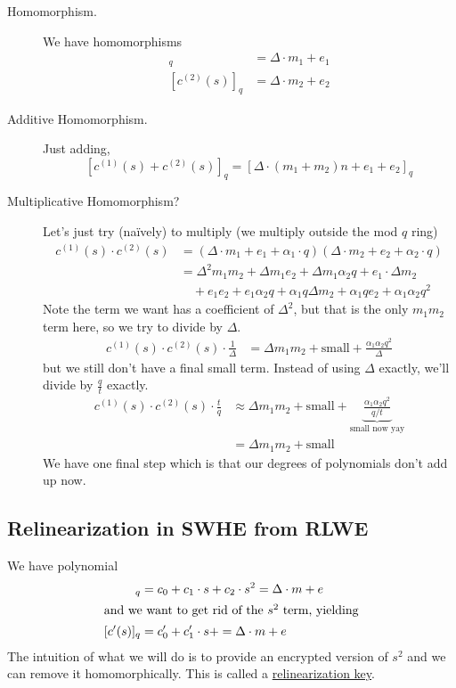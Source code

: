 \begin{description}
    \item[Homomorphism.] We have homomorphisms
        \begin{align*}
            [c^{(1)}(s)]_q & = \Delta\cdot m_1 + e_1 \\
            [c^{(2)}(s)]_q & = \Delta\cdot m_2 + e_2
        \end{align*}
    \item[Additive Homomorphism.] Just adding,
        \[[c^{(1)}(s) + c^{(2)}(s)]_q = [\Delta\cdot (m_1 + m_2)n + e_1 + e_2]_q\]
    \item[Multiplicative Homomorphism?] Let's just try (na\"ively) to multiply (we multiply outside the mod $q$ ring)
        \begin{align*}
            c^{(1)}(s) \cdot c^{(2)}(s)
             & = (\Delta\cdot m_1 + e_1 + \alpha_1\cdot q)(\Delta\cdot m_2 + e_2 + \alpha_2\cdot q)     \\
             & = \Delta^2 m_1m_2 + \Delta m_1e_2 + \Delta m_1\alpha_2q + e_1\cdot \Delta m_2            \\
             & \quad + e_1e_2 + e_1\alpha_2q + \alpha_1q\Delta m_2 + \alpha_1qe_2 + \alpha_1\alpha_2q^2
        \end{align*}
        Note the term we want has a coefficient of $\Delta^2$, but that is the only $m_1m_2$ term here, so we try to divide by $\Delta$.
        \begin{align*}
            c^{(1)}(s) \cdot c^{(2)}(s)\cdot \frac{1}{\Delta}
             & = \Delta m_1m_2 + \text{small} + \frac{\alpha_1\alpha_2q^2}{\Delta}
        \end{align*}
        but we still don't have a final small term. Instead of using $\Delta$ exactly, we'll divide by $\frac{q}{t}$ exactly.
        \begin{align*}
            c^{(1)}(s) \cdot c^{(2)}(s)\cdot \frac{t}{q}
             & \approx \Delta m_1m_2 + \text{small} + \underbrace{\frac{\alpha_1\alpha_2q^2}{q/t}}_{\text{small now yay}} \\
             & = \Delta m_1m_2 + \text{small}
        \end{align*}
        We have one final step which is that our degrees of polynomials don't add up now.
\end{description}


\subsection{Relinearization in SWHE from RLWE}
We have polynomial
\begin{align*}
    [c(s)]_q  & = c_0 + c_1\cdot s + c_2\cdot s^2 = \Delta \cdot m + e \\
    \intertext{and we want to get rid of the $s^2$ term, yielding}
    [c'(s)]_q & = c_0' + c_1'\cdot s + = \Delta \cdot m + e
\end{align*}
The intuition of what we will do is to provide an encrypted version of $s^2$ and we can remove it homomorphically. This is called a \ul{relinearization key}.

